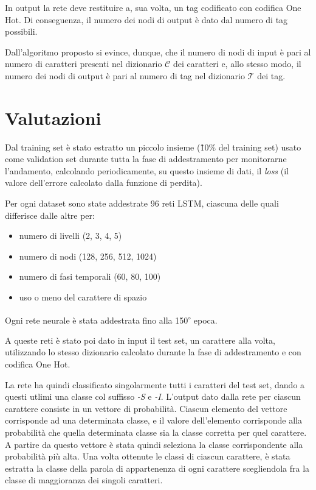 In output la rete deve restituire a, sua volta, un tag codificato con codifica
One Hot. Di conseguenza, il numero dei nodi di output \`e dato dal numero di tag
possibili.

Dall'algoritmo proposto si evince, dunque, che il numero di nodi di input \`e pari
al numero di caratteri presenti nel dizionario $\mathcal{C}$ dei caratteri e,
allo stesso modo, il numero dei nodi di output \`e pari al numero di tag nel
dizionario $\mathcal{T}$ dei tag.


\section{Valutazioni}

Dal training set \`e stato estratto un piccolo insieme (\~10\% del training set)
usato come validation set durante tutta la fase di addestramento per monitorarne
l'andamento, calcolando periodicamente, su questo insieme di dati, il \emph{loss}
(il valore dell'errore calcolato dalla funzione di perdita).

Per ogni dataset sono state addestrate 96 reti LSTM, ciascuna delle quali
differisce dalle altre per:

\begin{itemize}
  \item numero di livelli (2, 3, 4, 5)
  \item numero di nodi (128, 256, 512, 1024)
  \item numero di fasi temporali (60, 80, 100)
  \item uso o meno del carattere di spazio
\end{itemize}

Ogni rete neurale \`e stata addestrata fino alla 150\textsuperscript{$\circ$} epoca.

A queste reti \`e stato poi dato in input il test set, un carattere alla volta,
utilizzando lo stesso dizionario calcolato durante la fase di addestramento e con
codifica One Hot.

La rete ha quindi classificato singolarmente tutti i caratteri del test set,
dando a questi utlimi una classe col suffisso \emph{-S} e \emph{-I}. L'output
dato dalla rete per ciascun carattere consiste in un vettore di probabilit\`a.
Ciascun elemento del vettore corrisponde ad una determinata classe, e il valore
dell'elemento corrisponde alla probabilit\`a che quella determinata classe sia la
classe corretta per quel carattere. A partire da questo vettore \`e stata quindi
seleziona la classe corrispondente alla probabilit\`a pi\`u alta. Una volta ottenute
le classi di ciascun carattere, \`e stata estratta la classe della parola di appartenenza
di ogni carattere scegliendola fra la classe di maggioranza dei singoli caratteri.

